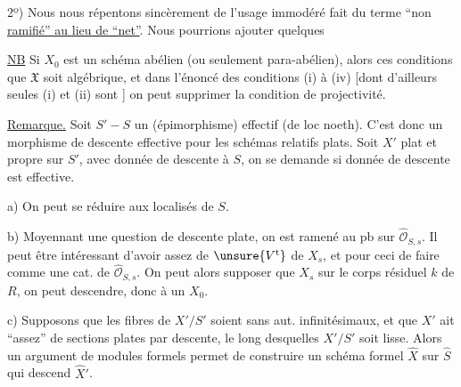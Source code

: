 2º) Nous nous répentons sincèrement de l'usage immodéré fait du terme ``non \uline{ramifié'' au lieu de ``net''}. Nous pourrions ajouter quelques


\uline{NB} Si $X_0$ est un schéma abélien  (ou seulement para-abélien), alors ces conditions   que $\mathfrak X$ soit algébrique, et dans l'énoncé des conditions (i) à (iv) [dont d'ailleurs seules (i) et (ii) sont ] on peut supprimer la condition de projectivité.

\uline{Remarque.} Soit $S'\mathbin{-}S$ un
(épimorphisme) effectif (de loc noeth). C'est donc un morphisme de descente effective pour les schémas relatifs plats. Soit $X'$ plat et propre sur $S'$, avec donnée de descente à $S$, on  se demande si donnée de descente est effective.

a) On peut se réduire aux localisés  de $S$.

b) Moyennant une question de descente   plate, on est ramené au pb sur $\widehat{\mathcal O}_{S,s}$. Il peut être intéressant d'avoir  assez de $\unsure{V^{\mathrm t}}$ de $X_s$, et pour ceci de faire comme une cat.    de $\widehat{\mathcal O}_{S,s}$. On peut alors supposer que $X_s$ sur le corps résiduel $k$ de $R$, on peut descendre, donc  à un $X_0$.

c) Supposons  que les fibres de $X'/S'$ soient sans aut. infinitésimaux, et que $X'$  ait  ``assez'' de sections   plates par descente, le long desquelles $X'/S'$ soit lisse. Alors un argument de modules formels permet de construire un schéma formel $\widehat X$ sur $\widehat S$ qui descend $\widehat X'$.



